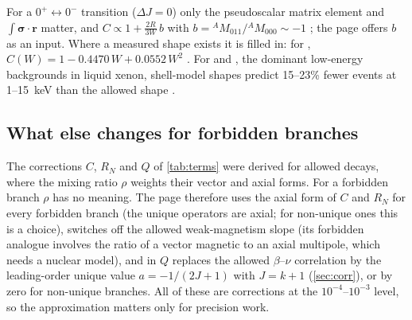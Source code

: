 For a $0^+\leftrightarrow0^-$ transition ($\Delta J = 0$) only the pseudoscalar matrix element and $\int\bm\sigma\cdot\bm r$ matter, and $C \propto 1 + \frac{2R}{3W}\,b$ with $b = {}^AM_{011}/{}^AM_{000} \sim -1$ \cite{hayen19}; the page offers $b$ as an input. Where a measured shape exists it is filled in: for , $C(W) = 1 - 0.4470\,W + 0.0552\,W^2$ \cite{alekseev}. For  and , the dominant low-energy backgrounds in liquid xenon, shell-model shapes predict 15--23\% fewer events at 1--15~keV than the allowed shape \cite{haselschwardt}.

\subsection{What else changes for forbidden branches}
The corrections $C$, $R_N$ and $Q$ of \cref{tab:terms} were derived for allowed decays, where the mixing ratio $\rho$ weights their vector and axial forms. For a forbidden branch $\rho$ has no meaning. The page therefore uses the axial form of $C$ and $R_N$ for every forbidden branch (the unique operators are axial; for non-unique ones this is a choice), switches off the allowed weak-magnetism slope (its forbidden analogue involves the ratio of a vector magnetic to an axial multipole, which needs a nuclear model), and in $Q$ replaces the allowed $\beta$--$\nu$ correlation by the leading-order unique value $a = -1/(2J+1)$ with $J = k+1$ (\cref{sec:corr}), or by zero for non-unique branches. All of these are corrections at the $10^{-4}$--$10^{-3}$ level, so the approximation matters only for precision work.

